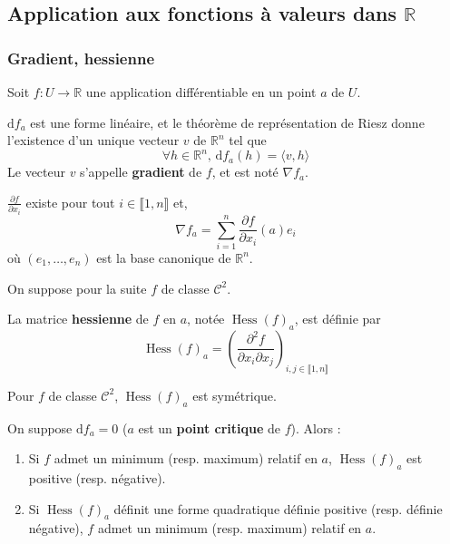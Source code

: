   \subsection{Application aux fonctions à valeurs dans \texorpdfstring{$\mathbb{R}$}{R}}

  \subsubsection{Gradient, hessienne}


  Soit $f : U \rightarrow \mathbb{R}$ une application différentiable en un point $a$ de $U$.

  \begin{definition}
    $\mathrm{d}f_a$ est une forme linéaire, et le théorème de représentation de Riesz donne l'existence d'un unique vecteur $v$ de $\mathbb{R}^n$ tel que
    \[ \forall h \in \mathbb{R}^n, \, \mathrm{d}f_a(h) = \langle v, h \rangle \]
    Le vecteur $v$ s'appelle \textbf{gradient} de $f$, et est noté $\nabla f_a$.
  \end{definition}

  \begin{proposition}
    $\frac{\partial f}{\partial x_i}$ existe pour tout $i \in \llbracket 1, n \rrbracket$ et,
    \[ \nabla f_a = \sum_{i=1}^n \frac{\partial f}{\partial x_i}(a) e_i \]
    où $(e_1, \dots, e_n)$ est la base canonique de $\mathbb{R}^n$.
  \end{proposition}


  On suppose pour la suite $f$ de classe $\mathcal{C}^2$.

  \begin{definition}
    La matrice \textbf{hessienne} de $f$ en $a$, notée $\operatorname{Hess}(f)_a$, est définie par
    \[ \operatorname{Hess}(f)_a = \left( \frac{\partial^2 f}{\partial x_i \partial x_j} \right)_{i,j \in \llbracket 1, n \rrbracket} \]
  \end{definition}

  \begin{remark}
    Pour $f$ de classe $\mathcal{C}^2$, $\operatorname{Hess}(f)_a$ est symétrique.
  \end{remark}

  \begin{theorem}
    On suppose $\mathrm{d}f_a = 0$ ($a$ est un \textbf{point critique} de $f$). Alors :
    \begin{enumerate}[label=(\roman*)]
      \item Si $f$ admet un minimum (resp. maximum) relatif en $a$, $\operatorname{Hess}(f)_a$ est positive (resp. négative).
      \item Si $\operatorname{Hess}(f)_a$ définit une forme quadratique définie positive (resp. définie négative), $f$ admet un minimum (resp. maximum) relatif en $a$.
    \end{enumerate}
  \end{theorem}

